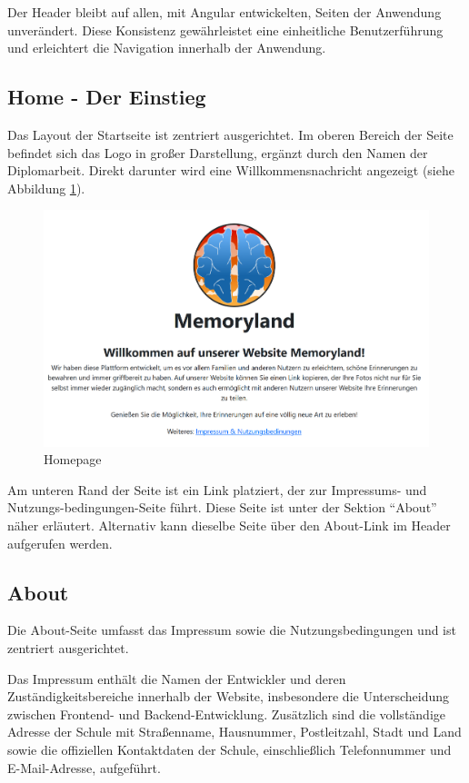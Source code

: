Der Header bleibt auf allen, mit Angular entwickelten, Seiten der Anwendung unverändert. Diese Konsistenz gewährleistet eine einheitliche Benutzerführung und erleichtert die Navigation innerhalb der Anwendung.


\subsection{Home - Der Einstieg}

Das Layout der Startseite ist zentriert ausgerichtet. Im oberen Bereich der Seite befindet sich das Logo in gro\ss{}er Darstellung, ergänzt durch den Namen der Diplomarbeit. Direkt darunter wird eine Willkommensnachricht angezeigt (siehe Abbildung \ref{fig:homepage}).

\begin{figure} [h t]
    \centering
    \includegraphics[scale=0.4]{pics/home_page.PNG}
    \caption{Homepage}
    \label{fig:homepage}
\end{figure}


Am unteren Rand der Seite ist ein Link platziert, der zur Impressums- und Nutzungs-bedingungen-Seite führt. Diese Seite ist unter der Sektion ``About'' näher erläutert. Alternativ kann dieselbe Seite über den About-Link im Header aufgerufen werden.

\subsection{About}

Die About-Seite umfasst das Impressum sowie die Nutzungsbedingungen und ist zentriert ausgerichtet.


Das Impressum enthält die Namen der Entwickler und deren Zuständigkeitsbereiche innerhalb der Website, insbesondere die Unterscheidung zwischen Frontend- und Backend-Entwicklung. Zusätzlich sind die vollständige Adresse der Schule mit Stra\ss{}enname, Hausnummer, Postleitzahl, Stadt und Land sowie die offiziellen Kontaktdaten der Schule, einschlie\ss{}lich Telefonnummer und E-Mail-Adresse, aufgeführt.

